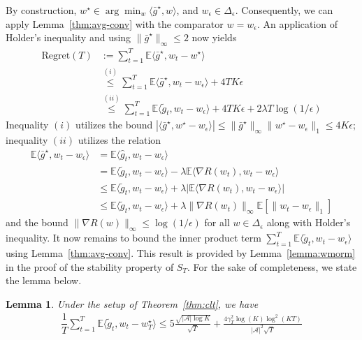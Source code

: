 \documentclass[11pt,letterpaper]{article}
\newcommand{\Exs}{\mathbb{E}}
\newcommand{\grad}{\nabla}
\newcommand{\gstar}{\bar{g}^\star}
\newcommand{\wstar}{w^\star}
\newcommand{\weps}{w_{\epsilon}}
\newcommand{\deleps}{\Delta_{\epsilon}}
\newcommand{\regT}{\mathrm{Regret}(T)}
\newcommand{\numactions}{|\mathcal{A}|}
\theoremstyle{plain}
\newtheorem*{lemma*}{Lemma}
\theoremstyle{definition}  %
\begin{document}
\noindent By construction, $\wstar \in \arg\min_{w} \langle \gstar, w \rangle$, and $\weps \in  \deleps$. Consequently, we can apply Lemma~\ref{thm:avg-conv} with the comparator $w = \weps$. An application of Holder's inequality and using $\|\gstar\|_\infty \leq 2$ now yields  
%
\begin{align}
    \regT &:=  \sum_{t=1}^T \Exs\langle \bar{g}^\star, w_t - \wstar \rangle \nonumber \\  
    &\stackrel{(i)}{\leq}  \sum_{t=1}^T \Exs\langle \gstar, w_t - \weps \rangle
    + 4T K \epsilon \nonumber   \\
    &\stackrel{(ii)}{\leq}  \sum_{t=1}^T \Exs\langle \tilde{g}_t , w_t - \weps \rangle  
    + 4T K \epsilon + 2\lambda T \log(1/\epsilon) \label{eqn:bound-1}
\end{align}
Inequality $(i)$ utilizes the bound $|\langle \gstar, \wstar - \weps \rangle | \leq \|\gstar\|_\infty \|\wstar - \weps\|_1 \leq 4K \epsilon$; inequality $(ii)$ utilizes the relation 
\begin{align*}
\Exs \langle \gstar, w_t - \weps \rangle
&= \Exs \langle \hat{g}_t, w_t - \weps \rangle \\[8pt]
&= \Exs \langle \tilde{g}_t, w_t - \weps \rangle - \lambda \Exs  \langle \grad R(w_t), w_t - \weps \rangle \\[8pt]
& \leq \Exs \langle \tilde{g}_t, w_t - \weps \rangle + \lambda | \Exs  \langle \grad R(w_t), w_t - \weps \rangle | \\[8pt]
& \leq \Exs \langle \tilde{g}_t, w_t - \weps \rangle + \lambda \| \grad R(w_t)\|_\infty \Exs[ \|w_t - \weps \|_1] 
\end{align*}
and the bound $\|\grad R(w)\|_\infty \leq \log(1/\epsilon)$ for all $w \in \deleps$ along with Holder's inequality. It now remains to bound the inner product term $\sum_{t=1}^T \Exs\langle \tilde{g}_t , w_t - \weps \rangle$ using Lemma~\ref{thm:avg-conv}. This result is provided by Lemma~\ref{lemma:wmorm} in the proof of the stability property of $S_T$. For the sake of completeness, we state the lemma below.
\begin{lemma*}
    Under the setup of Theorem~\ref{thm:clt}, we have
\begin{align*}
    \dfrac{1}{T} \sum_{t=1}^T \Exs\langle \tilde{g}_t , w_{t} - \wstar_T \rangle 
    \leq 
    5{\frac{\sqrt{\numactions \log K}}{\sqrt{T}}} +
     \frac{4\gamma_T^2 \log(K) \log^2\left( KT \right) }{ \numactions^2 \sqrt{T}  }
\end{align*}
\end{lemma*}
\end{document}
